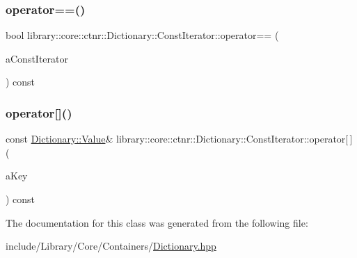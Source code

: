 \mbox{\label{classlibrary_1_1core_1_1ctnr_1_1Dictionary_1_1ConstIterator_a83feb60687b0d6b1e05afd2c92d1534f}} 
\subsubsection{\texorpdfstring{operator==()}{operator==()}}
{\footnotesize\ttfamily bool library\+::core\+::ctnr\+::\+Dictionary\+::\+Const\+Iterator\+::operator== (\begin{DoxyParamCaption}\item[{const \hyperlink{classlibrary_1_1core_1_1ctnr_1_1Dictionary_1_1ConstIterator}{Const\+Iterator} \&}]{a\+Const\+Iterator }\end{DoxyParamCaption}) const}

\mbox{\label{classlibrary_1_1core_1_1ctnr_1_1Dictionary_1_1ConstIterator_a06156b80cc285d4d960316953a70b695}} 
\subsubsection{\texorpdfstring{operator[]()}{operator[]()}}
{\footnotesize\ttfamily const \hyperlink{classlibrary_1_1core_1_1ctnr_1_1Dictionary_a3baf6692694e4fc27cb399ac083c88ea}{Dictionary\+::\+Value}\& library\+::core\+::ctnr\+::\+Dictionary\+::\+Const\+Iterator\+::operator\mbox{[}$\,$\mbox{]} (\begin{DoxyParamCaption}\item[{const \hyperlink{classlibrary_1_1core_1_1ctnr_1_1Dictionary_a987cae687cce70d81a2a483c5e05e842}{Dictionary\+::\+Key} \&}]{a\+Key }\end{DoxyParamCaption}) const}



The documentation for this class was generated from the following file\+:\begin{DoxyCompactItemize}
\item 
include/\+Library/\+Core/\+Containers/\hyperlink{Dictionary_8hpp}{Dictionary.\+hpp}\end{DoxyCompactItemize}
